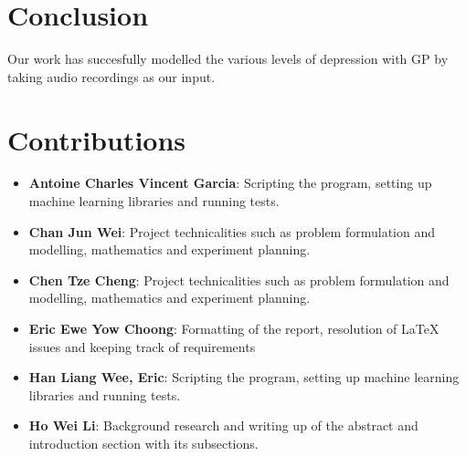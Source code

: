 \documentclass{article}
\begin{document}
	\section{Conclusion}	
	Our work has succesfully modelled the various levels of depression with GP by taking audio recordings as our input. \\
	
	\section{Contributions}
	\begin{itemize}
		\item \textbf{Antoine Charles Vincent Garcia}: 
		Scripting the program, setting up machine learning libraries and running tests.
		\item \textbf{Chan Jun Wei}: 
		Project technicalities such as problem formulation and modelling, mathematics and experiment planning.
		\item \textbf{Chen Tze Cheng}: 
		Project technicalities such as problem formulation and modelling, mathematics and experiment planning.
		\item \textbf{Eric Ewe Yow Choong}: 
		Formatting of the report, resolution of LaTeX issues and keeping track of requirements
		\item \textbf{Han Liang Wee, Eric}: 
		Scripting the program, setting up machine learning libraries and running tests.
		\item \textbf{Ho Wei Li}: 
		Background research and writing up of the abstract and introduction section with its subsections.
	\end{itemize}
	
	\newpage
	
	{\scriptsize }
\end{document}
